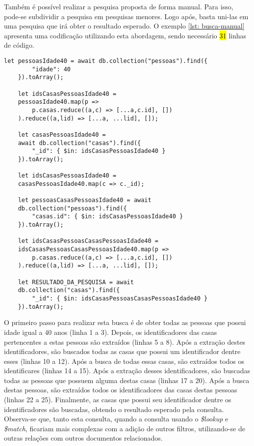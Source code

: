 Também é possível realizar a pesquisa proposta de forma manual. Para isso, pode-se subdividir a pesquisa em pesquisas menores. Logo após, basta uni-las em uma pesquisa que irá obter o resultado esperado. O exemplo \ref{lst: busca-manual} apresenta uma codificação utilizando esta abordagem, sendo necessário \hl{31} linhas de código.



\begin{lstlisting}[style=ES6, caption={Busca em Dados Normalizados de Forma Manual\label{lst: busca-manual}}]
    let pessoasIdade40 = await db.collection("pessoas").find({
        "idade": 40
    }).toArray();
    
    let idsCasasPessoasIdade40 = 
    pessoasIdade40.map(p => 
        p.casas.reduce((a,c) => [...a,c.id], [])
    ).reduce((a,lid) => [...a, ...lid], []);
    
    let casasPessoasIdade40 =
    await db.collection("casas").find({
        "_id": { $in: idsCasasPessoasIdade40 }
    }).toArray();
    
    let idsCasasPessoasIdade40 = 
    casasPessoasIdade40.map(c => c._id);
    
    let pessoasCasasPessoasIdade40 = await
    db.collection("pessoas").find({
        "casas.id": { $in: idsCasasPessoasIdade40 }
    }).toArray();
    
    let idsCasasPessoasCasasPessoasIdade40 = 
    idsCasasPessoasCasasPessoasIdade40.map(p => 
        p.casas.reduce((a,c) => [...a,c.id], [])
    ).reduce((a,lid) => [...a, ...lid], []);
    
    let RESULTADO_DA_PESQUISA = await
    db.collection("casas").find({
        "_id": { $in: idsCasasPessoasCasasPessoasIdade40 }
    }).toArray();
\end{lstlisting}
    
O primeiro passo para realizar esta busca é de obter todas as pessoas que possui idade igual a 40 anos (linha 1 a 3). Depois, os identificadores das casas pertencentes a estas pessoas são extraídos (linhas 5 a 8). Após a extração destes identificadores, são buscados todas as casas que possui um identificador dentre esses (linhas 10 a 12). Após a busca de todas essas casas, são extraídos todos os identificares (linhas 14 a 15). Após a extração desses identificadores, são buscadas todas as pessoas que possuem alguma destas casas (linhas 17 a 20). Após a busca destas pessoas, são extraídos todos os identificadores das casas destas pessoas (linhas 22 a 25). Finalmente, as casas que possui seu identificador dentre os identificadores são buscadas, obtendo o resultado esperado pela consulta. Observa-se que, tanto esta consulta, quando a consulta usando o \textit{\$lookup} e \textit{\$match}, ficariam mais complexas com a adição de outros filtros, utilizando-se de outras relações com outros documentos relacionados.

